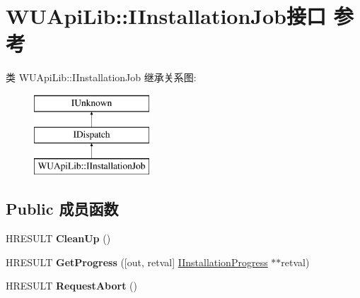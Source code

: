 \hypertarget{interface_w_u_api_lib_1_1_i_installation_job}{}\section{W\+U\+Api\+Lib\+:\+:I\+Installation\+Job接口 参考}
\label{interface_w_u_api_lib_1_1_i_installation_job}
类 W\+U\+Api\+Lib\+:\+:I\+Installation\+Job 继承关系图\+:\begin{figure}[H]
\begin{center}
\leavevmode
\includegraphics[height=3.000000cm]{interface_w_u_api_lib_1_1_i_installation_job}
\end{center}
\end{figure}
\subsection*{Public 成员函数}
\begin{DoxyCompactItemize}
\item 
\mbox{\label{interface_w_u_api_lib_1_1_i_installation_job_a18befbfc1489cd5187b72492fd5248ad}} 
H\+R\+E\+S\+U\+LT {\bfseries Clean\+Up} ()
\item 
\mbox{\label{interface_w_u_api_lib_1_1_i_installation_job_a49c81e89ff0193809b47b92bc44fabd5}} 
H\+R\+E\+S\+U\+LT {\bfseries Get\+Progress} (\mbox{[}out, retval\mbox{]} \hyperlink{interface_w_u_api_lib_1_1_i_installation_progress}{I\+Installation\+Progress} $\ast$$\ast$retval)
\item 
\mbox{\label{interface_w_u_api_lib_1_1_i_installation_job_a25545169cf9f9e25e66d2b4bce8efa24}} 
H\+R\+E\+S\+U\+LT {\bfseries Request\+Abort} ()
\end{DoxyCompactItemize}
